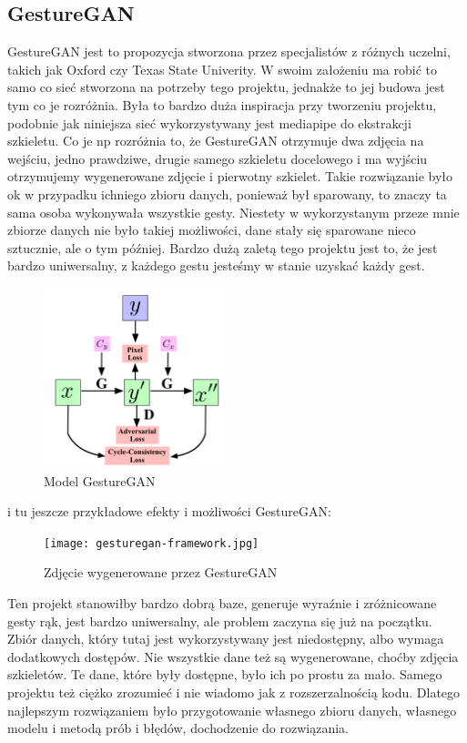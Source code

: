 \documentclass[12pt]{article}
\begin{document}
\begin{sloppypar}
{  \subsection{GestureGAN}
  {
    GestureGAN\cite{gesture-gan} jest to propozycja stworzona przez specjalistów z różnych uczelni, takich jak Oxford czy Texas State Univerity.
    W swoim założeniu ma robić to samo co sieć stworzona na potrzeby tego projektu, jednakże to jej budowa jest tym co je rozróżnia.
    Była to bardzo duża inspiracja przy tworzeniu projektu, podobnie jak niniejsza sieć wykorzystywany jest mediapipe do ekstrakcji szkieletu. 
    Co je np rozróżnia to, że GestureGAN otrzymuje dwa zdjęcia na wejściu, jedno prawdziwe, drugie samego szkieletu docelowego i ma wyjściu otrzymujemy wygenerowane zdjęcie i pierwotny szkielet.
    Takie rozwiązanie było ok w przypadku ichniego zbioru danych, ponieważ był sparowany, to znaczy ta sama osoba wykonywała wszystkie gesty. 
    Niestety w wykorzystanym przeze mnie zbiorze danych nie było takiej możliwości, dane stały się sparowane nieco sztucznie, ale o tym później.
    Bardzo dużą zaletą tego projektu jest to, że jest bardzo uniwersalny, z każdego gestu jesteśmy w stanie uzyskać każdy gest.
    \begin{figure}[H]
      \centering
      \includegraphics{gesture-gan.png}
      \caption{Model GestureGAN \cite{gesture-gan}}
      \label{fig:gesture-gan-budowa}
    \end{figure}
    i tu jeszcze przykładowe efekty i możliwości GestureGAN:
    \begin{figure}[H]
      \centering
      \texttt{[image: gesturegan-framework.jpg]}
      \caption{Zdjęcie wygenerowane przez GestureGAN \cite{gesture-gan}}
      \label{fig:gesture-gan-przyklady}
    \end{figure}
    Ten projekt stanowiłby bardzo dobrą baze, generuje wyraźnie i zróżnicowane gesty rąk, jest bardzo uniwersalny, ale problem zaczyna się już na początku.
    Zbiór danych, który tutaj jest wykorzystywany jest niedostępny, albo wymaga dodatkowych dostępów. Nie wszystkie dane też są wygenerowane, choćby zdjęcia szkieletów.
    Te dane, które były dostępne, było ich po prostu za mało. Samego projektu też ciężko zrozumieć i nie wiadomo jak z rozszerzalnością kodu.
    Dlatego najlepszym rozwiązaniem było przygotowanie własnego zbioru danych, własnego modelu i metodą prób i błędów, dochodzenie do rozwiązania.
  }
}
\end{sloppypar}
\end{document}

